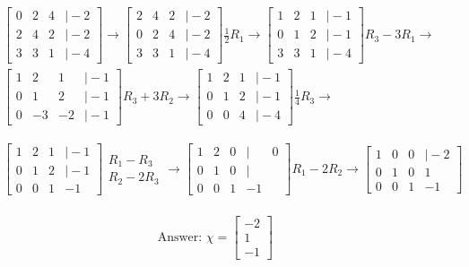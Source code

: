 \documentclass[10pt]{article}
\begin{document}
$$
\begin{aligned}
& {\left[\begin{array}{llll}
0 & 2 & 4 & \mid-2 \\
2 & 4 & 2 & \mid-2 \\
3 & 3 & 1 & \mid-4
\end{array}\right] \rightarrow\left[\begin{array}{llll}
2 & 4 & 2 & \mid-2 \\
0 & 2 & 4 & \mid-2 \\
3 & 3 & 1 & \mid-4
\end{array}\right] \frac{1}{2} R_{1} \rightarrow\left[\begin{array}{llll}
1 & 2 & 1 & \mid-1 \\
0 & 1 & 2 & \mid-1 \\
3 & 3 & 1 & \mid-4
\end{array}\right] R_{3}-3 R_{1} \rightarrow } \\
& {\left[\begin{array}{ccc|c}
1 & 2 & 1 & \mid-1 \\
0 & 1 & 2 & \mid-1 \\
0 & -3 & -2 & \mid-1
\end{array}\right] R_{3}+3 R_{2} \rightarrow\left[\begin{array}{llll}
1 & 2 & 1 & \mid-1 \\
0 & 1 & 2 & \mid-1 \\
0 & 0 & 4 & \mid-4
\end{array}\right] \frac{1}{4} R_{3} \rightarrow }
\end{aligned}
$$

$$
\begin{aligned}
& {\left[\begin{array}{cccc}
1 & 2 & 1 & \mid-1 \\
0 & 1 & 2 & \mid-1 \\
0 & 0 & 1 & -1
\end{array}\right] \begin{array}{c}
R_{1}-R_{3} \\
R_{2}-2 R_{3}
\end{array} \rightarrow\left[\begin{array}{cccc|c}
1 & 2 & 0 & \mid & 0 \\
0 & 1 & 0 & \mid \\
0 & 0 & 1 & -1
\end{array}\right] R_{1}-2 R_{2} \rightarrow\left[\begin{array}{ccccc}
1 & 0 & 0 & \mid-2 \\
0 & 1 & 0 & 1 \\
0 & 0 & 1 & -1
\end{array}\right]} \\
\end{aligned}
$$
\begin{tcolorbox}[colback=red!5!white,colframe=red!75!black]
  \centering $$
\text { Answer: } \chi=\left[\begin{array}{c}
-2 \\
1 \\
-1
\end{array}\right]
$$

\end{tcolorbox}
\end{document}
